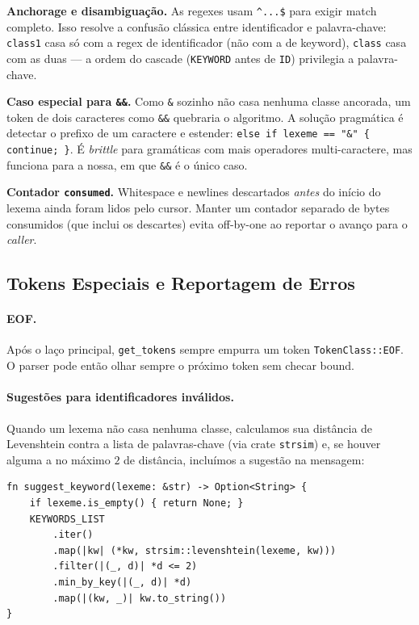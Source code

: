 \documentclass[12pt,a4paper]{article}
\begin{document}
\textbf{Anchorage e disambiguação.} As regexes usam \verb|^...$| para
exigir match completo. Isso resolve a confusão clássica entre
identificador e palavra-chave: \texttt{class1} casa só com a regex
de identificador (não com a de keyword), \texttt{class} casa com as
duas --- a ordem do cascade (\texttt{KEYWORD} antes de \texttt{ID})
privilegia a palavra-chave.

\textbf{Caso especial para \texttt{\&\&}.} Como \verb|&| sozinho não
casa nenhuma classe ancorada, um token de dois caracteres como
\verb|&&| quebraria o algoritmo. A solução pragmática é detectar o
prefixo de um caractere e estender:
\verb|else if lexeme == "&" { continue; }|. É \emph{brittle} para
gramáticas com mais operadores multi-caractere, mas funciona para a
nossa, em que \verb|&&| é o único caso.

\textbf{Contador \texttt{consumed}.} Whitespace e newlines descartados
\emph{antes} do início do lexema ainda foram lidos pelo cursor. Manter
um contador separado de bytes consumidos (que inclui os descartes)
evita off-by-one ao reportar o avanço para o \emph{caller}.

\subsection{Tokens Especiais e Reportagem de Erros}

\paragraph{EOF.} Após o laço principal, \texttt{get\_tokens} sempre
empurra um token \texttt{TokenClass::EOF}. O parser pode então olhar
sempre o próximo token sem checar bound.

\paragraph{Sugestões para identificadores inválidos.} Quando um lexema
não casa nenhuma classe, calculamos sua distância de Levenshtein
contra a lista de palavras-chave (via crate \texttt{strsim}) e, se
houver alguma a no máximo $2$ de distância, incluímos a sugestão na
mensagem:

\begin{lstlisting}[caption={Sugestão por distância de edição}]
fn suggest_keyword(lexeme: &str) -> Option<String> {
    if lexeme.is_empty() { return None; }
    KEYWORDS_LIST
        .iter()
        .map(|kw| (*kw, strsim::levenshtein(lexeme, kw)))
        .filter(|(_, d)| *d <= 2)
        .min_by_key(|(_, d)| *d)
        .map(|(kw, _)| kw.to_string())
}
\end{lstlisting}
\end{document}
